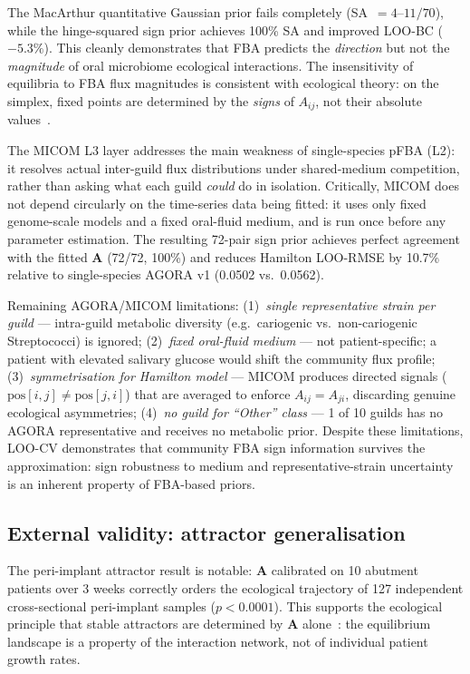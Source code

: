 \documentclass[11pt,a4paper]{article}
\newcommand{\bA}{\mathbf{A}}
\begin{document}
The MacArthur quantitative Gaussian prior fails completely (SA~$=4$--$11/70$),
while the hinge-squared sign prior achieves 100\% SA and improved LOO-BC ($-5.3\%$).
This cleanly demonstrates that FBA predicts the \emph{direction} but not the
\emph{magnitude} of oral microbiome ecological interactions.
The insensitivity of equilibria to FBA flux magnitudes is consistent with ecological
theory: on the simplex, fixed points are determined by the \emph{signs} of $A_{ij}$,
not their absolute values~\citep{hofbauer1998}.

The MICOM L3 layer addresses the main weakness of single-species pFBA (L2):
it resolves actual inter-guild flux distributions under shared-medium competition,
rather than asking what each guild \emph{could} do in isolation.
Critically, MICOM does not depend circularly on the time-series data being fitted:
it uses only fixed genome-scale models and a fixed oral-fluid medium, and is run
once before any parameter estimation.
The resulting 72-pair sign prior achieves perfect agreement with the fitted $\bA$
(72/72, 100\%) and reduces Hamilton LOO-RMSE by 10.7\% relative to single-species
AGORA v1 (0.0502 vs.\ 0.0562).

Remaining AGORA/MICOM limitations:
(1)~\emph{single representative strain per guild} — intra-guild metabolic diversity
(e.g.\ cariogenic vs.\ non-cariogenic Streptococci) is ignored;
(2)~\emph{fixed oral-fluid medium} — not patient-specific; a patient with elevated
salivary glucose would shift the community flux profile;
(3)~\emph{symmetrisation for Hamilton model} — MICOM produces directed signals
($\text{pos}[i,j] \ne \text{pos}[j,i]$) that are averaged to enforce $A_{ij}=A_{ji}$,
discarding genuine ecological asymmetries;
(4)~\emph{no guild for ``Other'' class} — 1 of 10 guilds has no AGORA representative
and receives no metabolic prior.
Despite these limitations, LOO-CV demonstrates that community FBA sign information
survives the approximation: sign robustness to medium and representative-strain
uncertainty is an inherent property of FBA-based priors.

\subsection{External validity: attractor generalisation}
\label{ssec:disc_joshi}

The peri-implant attractor result is notable: $\bA$ calibrated on 10 abutment patients
over 3 weeks correctly orders the ecological trajectory of 127 independent cross-sectional
peri-implant samples ($p<0.0001$). This supports the ecological principle that stable
attractors are determined by $\bA$ alone~\citep{hofbauer1998}: the equilibrium landscape
is a property of the interaction network, not of individual patient growth rates.
\end{document}
